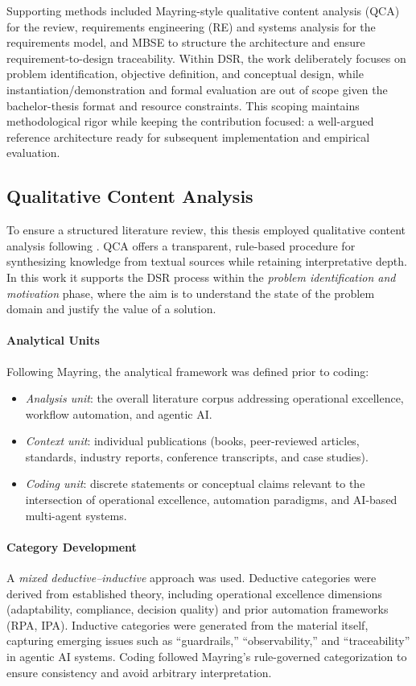 Supporting methods included Mayring-style qualitative content analysis (QCA) for the review, requirements engineering (RE) and systems analysis for the requirements model, and MBSE to structure the architecture and ensure requirement-to-design traceability. Within DSR, the work deliberately focuses on problem identification, objective definition, and conceptual design, while instantiation/demonstration and formal evaluation are out of scope given the bachelor-thesis format and resource constraints. This scoping maintains methodological rigor while keeping the contribution focused: a well-argued reference architecture ready for subsequent implementation and empirical evaluation.

\subsection{Qualitative Content Analysis}\label{subsec:qca}
To ensure a structured literature review, this thesis employed qualitative content analysis following \textcite{mayringQualitative2022}. 
QCA offers a transparent, rule-based procedure for synthesizing knowledge from textual sources while retaining interpretative depth. 
In this work it supports the DSR process \parencite{peffersDesignScienceMethodology2007} within the \emph{problem identification and motivation} phase, 
where the aim is to understand the state of the problem domain and justify the value of a solution.

\paragraph*{Analytical Units}
Following Mayring, the analytical framework was defined prior to coding:
\begin{itemize}
    \item \textit{Analysis unit}: the overall literature corpus addressing operational excellence, workflow automation, and agentic AI.
    \item \textit{Context unit}: individual publications (books, peer-reviewed articles, standards, industry reports, conference transcripts, and case studies).
    \item \textit{Coding unit}: discrete statements or conceptual claims relevant to the intersection of operational excellence, automation paradigms, and AI-based multi-agent systems.
\end{itemize}

\paragraph*{Category Development}
A \emph{mixed deductive--inductive} approach was used. Deductive categories were derived from established theory, including operational excellence dimensions (adaptability, compliance, decision quality) and prior automation frameworks (RPA, IPA). 
Inductive categories were generated from the material itself, capturing emerging issues such as ``guardrails,'' ``observability,'' and ``traceability'' in agentic AI systems. 
Coding followed Mayring's rule-governed categorization to ensure consistency and avoid arbitrary interpretation.

